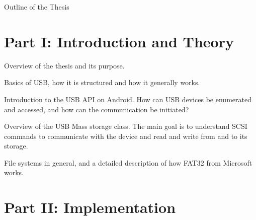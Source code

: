 \clearemptydoublepage

{}

\begin{center}
	\huge{Outline of the Thesis}
\end{center}




\section*{Part I: Introduction and Theory}

  \vspace{1mm}

\noindent  Overview of the thesis and its purpose. \\

  \vspace{1mm}

\noindent  Basics of USB, how it is structured and how it generally works.   \\

  \vspace{1mm}

\noindent  Introduction to the USB API on Android. How can USB devices be enumerated and accessed, and how can the communication be initiated? \\

  \vspace{1mm}

\noindent  Overview of the USB Mass storage class. The main goal is to understand SCSI commands to communicate with the device and read and write from and to its storage. \\

  \vspace{1mm}

\noindent  File systems in general, and a detailed description of how FAT32 from Microsoft works. \\

\section*{Part II: Implementation}

